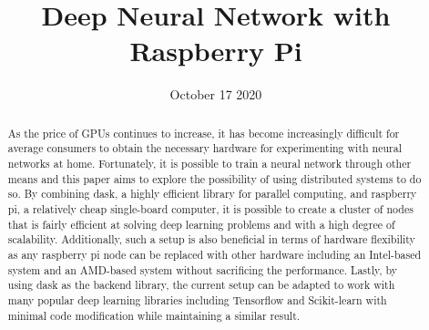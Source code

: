 \documentclass{IEEEtran}
\begin{document}
    \title{Deep Neural Network with Raspberry Pi}


    \author{
    }
    \date{October 17 2020}
    \maketitle

    \begin{abstract}
        As the price of GPUs continues to increase, it has become increasingly difficult for average consumers to obtain the necessary hardware for experimenting with neural networks at home. Fortunately, it is possible to train a neural network through other means and this paper aims to explore the possibility of using distributed systems to do so. By combining dask, a highly efficient library for parallel computing, and raspberry pi, a relatively cheap single-board computer, it is possible to create a cluster of nodes that is fairly efficient at solving deep learning problems and with a high degree of scalability. Additionally, such a setup is also beneficial in terms of hardware flexibility as any raspberry pi node can be replaced with other hardware including an Intel-based system and an AMD-based system without sacrificing the performance. Lastly, by using dask as the backend library, the current setup can be adapted to work with many popular deep learning libraries including Tensorflow and Scikit-learn with minimal code modification while maintaining a similar result.
        \end{abstract}
\end{document}
